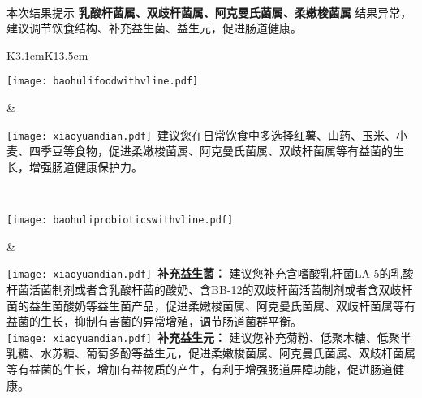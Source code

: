 \noindent\fontsize{12pt}{12pt}\selectfont {菌群调理建议} \\

\vspace*{-2mm}
\begin{spacing}{1.3}
\noindent\fontsize{9pt}{11pt}\selectfont
本次结果提示 {\bf 乳酸杆菌属、双歧杆菌属、阿克曼氏菌属、柔嫩梭菌属} 结果异常，建议调节饮食结构、补充益生菌、益生元，促进肠道健康。
\end{spacing}

\setlength{\arrayrulewidth}{.5pt}
\vspace*{-2mm}
\begin{center}
\begin{tabular}{K{3.1cm}K{13.5cm}}
\hline

\parbox[c][3cm]{.95\hsize}{
\noindent
\texttt{[image: baohulifoodwithvline.pdf]}
}
 &
\parbox{\hsize}{
\vspace*{0.5mm}
\begin{spacing}{1.5}
\fontsize{10pt}{10pt}
{\texttt{[image: xiaoyuandian.pdf]}\fontsize{9pt}{10pt}\selectfont \ 建议您在日常饮食中多选择红薯、山药、玉米、小麦、四季豆等食物，促进柔嫩梭菌属、阿克曼氏菌属、双歧杆菌属等有益菌的生长，增强肠道健康保护力。}
\end{spacing}
} \\
\hline

\parbox[c][4.5cm]{.95\hsize}{
\noindent
\texttt{[image: baohuliprobioticswithvline.pdf]}
}
 &
\parbox{\hsize}{
\vspace*{0.5mm}
\begin{spacing}{1.5}
\fontsize{10pt}{10pt}
{\texttt{[image: xiaoyuandian.pdf]}\fontsize{9pt}{10pt}\selectfont \ {\bf {补充益生菌：}} 建议您补充含嗜酸乳杆菌LA-5的乳酸杆菌活菌制剂或者含乳酸杆菌的酸奶、含BB-12的双歧杆菌活菌制剂或者含双歧杆菌的益生菌酸奶等益生菌产品，促进柔嫩梭菌属、阿克曼氏菌属、双歧杆菌属等有益菌的生长，抑制有害菌的异常增殖，调节肠道菌群平衡。 \\}
{\texttt{[image: xiaoyuandian.pdf]}\fontsize{9pt}{10pt}\selectfont \ {\bf {补充益生元：}} 建议您补充菊粉、低聚木糖、低聚半乳糖、水苏糖、葡萄多酚等益生元，促进柔嫩梭菌属、阿克曼氏菌属、双歧杆菌属等有益菌的生长，增加有益物质的产生，有利于增强肠道屏障功能，促进肠道健康。}
\end{spacing}
} \\
\hline

\end{tabular}
\end{center}




